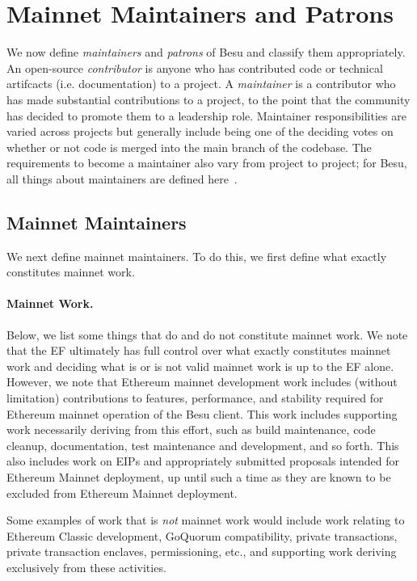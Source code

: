 
\section{Mainnet Maintainers and Patrons} \label{sec:maintainers}
We now define \emph{maintainers} and \emph{patrons} of Besu and classify them appropriately.  An open-source \emph{contributor} is anyone who has contributed code or technical artifcacts (i.e. documentation) to a project.  A \emph{maintainer} is a contributor who has made substantial contributions to a project, to the point that the community has decided to promote them to a leadership role.  Maintainer responsibilities are varied across projects but generally include being one of the deciding votes on whether or not code is merged into the main branch of the codebase.  The requirements to become a maintainer also vary from project to project; for Besu, all things about maintainers are defined here~\cite{BesuM}.  

\subsection{Mainnet Maintainers}
We next define mainnet maintainers.  To do this, we first define what exactly constitutes mainnet work.  

\paragraph{Mainnet Work.} Below, we list some things that do and do not constitute mainnet work.  We note that the EF ultimately has full control over what exactly constitutes mainnet work and deciding what is or is not valid mainnet work is up to the EF alone.  However, we note that Ethereum mainnet development work includes (without limitation) contributions to features, performance, and stability required for Ethereum mainnet operation of the Besu client. This work includes supporting work necessarily deriving from this effort, such as build maintenance, code cleanup, documentation, test maintenance and development, and so forth. This also includes work on EIPs and appropriately submitted proposals intended for Ethereum Mainnet deployment, up until such a time as they are known to be excluded from Ethereum Mainnet deployment.

Some examples of work that is \emph{not} mainnet work would include work relating to Ethereum Classic development, GoQuorum compatibility, private transactions, private transaction enclaves, permissioning, etc., and supporting work deriving exclusively from these activities.


